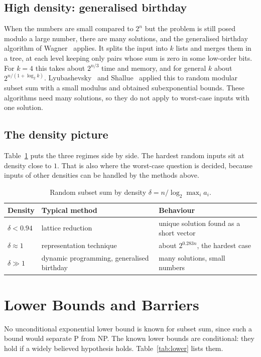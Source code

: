 \documentclass[11pt]{article}
\begin{document}
\subsection{High density: generalised birthday}
When the numbers are small compared to $2^n$ but the problem is still posed
modulo a large number, there are many solutions, and the generalised birthday
algorithm of Wagner~\cite{wag} applies. It splits the input into $k$ lists and
merges them in a tree, at each level keeping only pairs whose sum is zero in
some low-order bits. For $k=4$ this takes about $2^{n/3}$ time and memory, and
for general $k$ about $2^{n/(1+\log_2k)}$. Lyubashevsky~\cite{lyu} and
Shallue~\cite{sha} applied this to random modular subset sum with a small
modulus and obtained subexponential bounds. These algorithms need many
solutions, so they do not apply to worst-case inputs with one solution.

\subsection{The density picture}
Table~\ref{tab:density} puts the three regimes side by side. The hardest
random inputs sit at density close to $1$. That is also where the worst-case
question is decided, because inputs of other densities can be handled by the
methods above.

\begin{table}[t]
\centering
\caption{Random subset sum by density $\delta=n/\log_2\max_ia_i$.}
\label{tab:density}
\small
\begin{tabular}{p{3cm}p{4cm}p{6cm}}
\toprule
Density & Typical method & Behaviour \\
\midrule
$\delta<0.94$ & lattice reduction~\cite{lo,cjloss} & unique solution found as a short vector \\
$\delta\approx1$ & representation technique~\cite{bcj,bbss} & about $2^{0.283n}$, the hardest case \\
$\delta\gg1$ & dynamic programming, generalised birthday~\cite{wag} & many solutions, small numbers \\
\bottomrule
\end{tabular}
\end{table}

\section{Lower Bounds and Barriers}\label{sec:lower}
No unconditional exponential lower bound is known for subset sum, since such a
bound would separate P from NP. The known lower bounds are conditional: they
hold if a widely believed hypothesis holds. Table~\ref{tab:lower} lists them.
\end{document}
